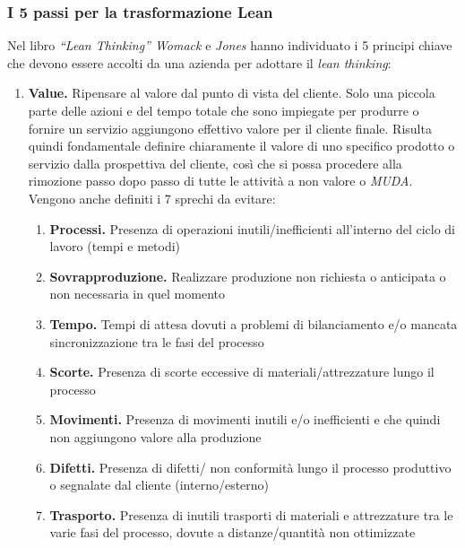 \subsubsection{I 5 passi per la trasformazione Lean}
Nel libro \textit{“Lean Thinking” Womack} e \textit{Jones} hanno individuato i 5 principi chiave che devono essere accolti da una azienda per adottare il \textit{lean thinking}:
\begin{enumerate}
	\item \textbf{Value.} Ripensare al valore dal punto di vista del cliente. Solo una piccola parte delle azioni e del tempo totale che sono impiegate per produrre o fornire un servizio aggiungono effettivo valore per il cliente finale. Risulta quindi fondamentale definire chiaramente il valore di uno specifico prodotto o servizio dalla prospettiva del cliente, così che si possa procedere alla rimozione passo dopo passo di tutte le attività a non valore o \textit{MUDA}. Vengono anche definiti i 7 sprechi da evitare:
		\begin{enumerate}[label=\arabic*.]
			\item \textbf{Processi.} Presenza di operazioni inutili/inefficienti all’interno del ciclo di lavoro (tempi e metodi)
			\item \textbf{Sovrapproduzione.} Realizzare produzione non richiesta o anticipata o non necessaria in quel momento
			\item \textbf{Tempo.} Tempi di attesa dovuti a problemi di bilanciamento e/o mancata sincronizzazione tra le fasi del processo
			\item \textbf{Scorte.} Presenza di scorte eccessive di materiali/attrezzature lungo il processo
			\item \textbf{Movimenti.} Presenza di movimenti inutili e/o inefficienti e che quindi non aggiungono valore alla produzione
			\item \textbf{Difetti.} Presenza di difetti/ non conformità lungo il processo produttivo o segnalate dal cliente (interno/esterno)
			\item \textbf{Trasporto.} Presenza di inutili trasporti di materiali e attrezzature tra le varie fasi del processo, dovute a distanze/quantità
				non ottimizzate
		\end{enumerate}
		

\end{enumerate}
